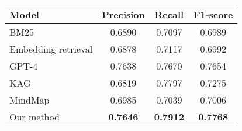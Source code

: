 \begin{tabular}{lccc}
\toprule
\textbf{Model} & \textbf{Precision} & \textbf{Recall} & \textbf{F1-score} \\
\midrule
BM25 & 0.6890 & 0.7097 & 0.6989 \\
Embedding retrieval & 0.6878 & 0.7117 & 0.6992 \\
\midrule
GPT-4 & 0.7638 & 0.7670 & 0.7654 \\
\midrule
KAG & 0.6819 & 0.7797 & 0.7275 \\
MindMap & 0.6985 & 0.7039 & 0.7006 \\
Our method & \textbf{0.7646} & \textbf{0.7912} & \textbf{0.7768} \\
\bottomrule
\end{tabular}
